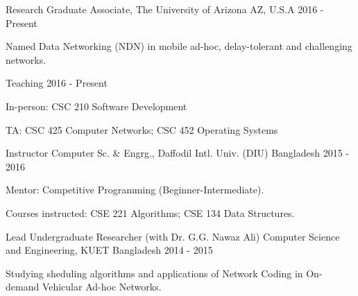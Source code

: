 

\begin{cventries}

  \cventry
    {Research} %
    {Graduate Associate, The University of Arizona} %
    {AZ, U.S.A} %
    {2016 - Present} %
    {
      \begin{cvitems} %
        \item {Named Data Networking (NDN) in mobile ad-hoc, delay-tolerant and challenging networks.}
      \end{cvitems}
    }
    {}

  \cventry
    {Teaching} %
    {} %
    {} %
    {2016 - Present} %
    {
      \begin{cvitems} %
        \item {In-person: CSC 210 Software Development}
        \item {TA: CSC 425 Computer Networks; CSC 452 Operating Systems}
      \end{cvitems}
    }
    {}

  \cventry
    {Instructor} %
    {Computer Sc. \& Engrg., Daffodil Intl. Univ. (DIU)} %
    {Bangladesh} %
    {2015 - 2016} %
    {
      \begin{cvitems} %
        \item {Mentor: Competitive Programming (Beginner-Intermediate).}
        \item {Courses instructed: CSE 221 Algorithms; CSE 134 Data Structures.}
      \end{cvitems}
    }
    {}

  \cventry
    {Lead Undergraduate Researcher (with Dr. G.G. Nawaz Ali)} %
    {Computer Science and Engineering, KUET} %
    {Bangladesh} %
    {2014 - 2015} %
    {
      \begin{cvitems} %
        \item {Studying sheduling algorithms and applications of Network Coding in On-demand Vehicular Ad-hoc Networks.}
      \end{cvitems}
    }
    {}


\end{cventries}

